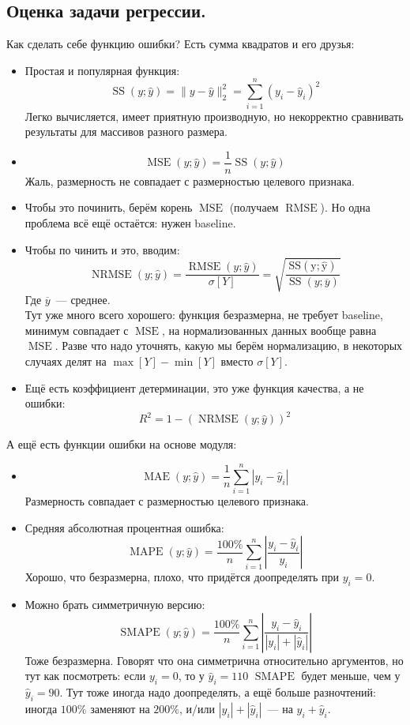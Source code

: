 \documentclass{article}
\begin{document}
    \subsection{Оценка задачи регрессии.}
    Как сделать себе функцию ошибки? Есть сумма квадратов и его друзья:
    \begin{itemize}
        \item Простая и популярная функция:
        \[
        \operatorname{SS}(y;\widehat y)=\|y-\widehat y\|^2_2=\sum\limits_{i=1}^n(y_i-\widehat y_i)^2
        \]
        Легко вычисляется, имеет приятную производную, но некорректно сравнивать результаты для массивов разного размера.
        \item
        \[
        \operatorname{MSE}(y;\widehat y)=\frac1n\operatorname{SS}(y;\widehat y)
        \]
        Жаль, размерность не совпадает с размерностью целевого признака.
        \item Чтобы это починить, берём корень $\operatorname{MSE}$ (получаем $\operatorname{RMSE}$). Но одна проблема всё ещё остаётся: нужен baseline.
        \item Чтобы по чинить и это, вводим:
        \[
        \operatorname{NRMSE}(y;\widehat y)=\frac{\operatorname{RMSE}(y;\widehat y)}{\sigma[Y]}=\sqrt{\frac{\operatorname{SS(y;\widehat y)}}{\operatorname{SS}(y;\overline y)}}
        \]
        Где $\overline y$~--- среднее.\\
        Тут уже много всего хорошего: функция безразмерна, не требует baseline, минимум совпадает с $\operatorname{MSE}$, на нормализованных данных вообще равна $\operatorname{MSE}$. Разве что надо уточнять, какую мы берём нормализацию, в некоторых случаях делят на $\max[Y]-\min[Y]$ вместо $\sigma[Y]$.
        \item Ещё есть коэффициент детерминации, это уже функция качества, а не ошибки:
        \[
        R^2=1-(\operatorname{NRMSE}(y;\widehat y))^2
        \]
    \end{itemize}
    А ещё есть функции ошибки на основе модуля:
    \begin{itemize}
        \item \[\operatorname{MAE}(y;\widehat y)=\frac1n\sum\limits_{i=1}^n|y_i-\widehat y_i|\]
        Размерность совпадает с размерностью целевого признака.
        \item Средняя абсолютная процентная ошибка:
        \[
        \operatorname{MAPE}(y;\widehat y)=\frac{100\%}n\sum\limits_{i=1}^n\left|\frac{y_i-\widehat y_i}{y_i}\right|
        \]
        Хорошо, что безразмерна, плохо, что придётся доопределять при $y_i=0$.
        \item Можно брать симметричную версию:
        \[
        \operatorname{SMAPE}(y;\widehat y)=\frac{100\%}n\sum\limits_{i=1}^n\left|\frac{y_i-\widehat y_i}{|y_i|+|\widehat y_i|}\right|
        \]
        Тоже безразмерна. Говорят что она симметрична относительно аргументов, но тут как посмотреть: если $y_i=0$, то у $\widehat y_i=110$ $\operatorname{SMAPE}$ будет меньше, чем у $\widehat y_i=90$. Тут тоже иногда надо доопределять, а ещё больше разночтений: иногда $100\%$ заменяют на $200\%$, и/или $|y_i|+|\widehat y_i|$~--- на $y_i+\widehat y_i$.
    \end{itemize}
\end{document}
